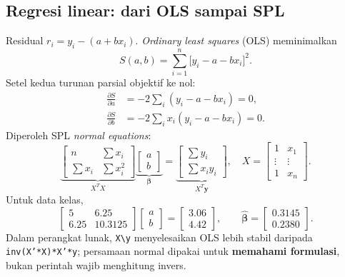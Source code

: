 \subsection{Regresi linear: dari OLS sampai SPL}
Residual $r_i=y_i-(a+bx_i)$. \emph{Ordinary least squares} (OLS) meminimalkan
\begin{equation}
S(a,b)=\sum_{i=1}^n\bigl[y_i-a-bx_i\bigr]^2.
\end{equation}
Setel kedua turunan parsial objektif ke nol:
\begin{align}
\frac{\partial S}{\partial a}&=-2\sum_i(y_i-a-bx_i)=0,\\
\frac{\partial S}{\partial b}&=-2\sum_ix_i(y_i-a-bx_i)=0.
\end{align}
Diperoleh SPL \emph{normal equations}:
\begin{equation}
\underbrace{\begin{bmatrix}n&\sum x_i\\\sum x_i&\sum x_i^2\end{bmatrix}}_{X^TX}
\underbrace{\begin{bmatrix}a\\b\end{bmatrix}}_{\boldsymbol\beta}
=\underbrace{\begin{bmatrix}\sum y_i\\\sum x_i y_i\end{bmatrix}}_{X^T\mathbf{y}},\quad
X=\begin{bmatrix}1&x_1\\\vdots&\vdots\\1&x_n\end{bmatrix}.
\label{eq:linear_normal}
\end{equation}
Untuk data kelas,
\begin{equation}
\begin{bmatrix}5&6.25\\6.25&10.3125\end{bmatrix}
\begin{bmatrix}a\\b\end{bmatrix}
=\begin{bmatrix}3.06\\4.42\end{bmatrix},\qquad
\widehat{\boldsymbol\beta}=\begin{bmatrix}0.3145\\0.2380\end{bmatrix}.
\end{equation}
Dalam perangkat lunak, \texttt{X\textbackslash y} menyelesaikan OLS lebih stabil daripada \texttt{inv(X'*X)*X'*y}; persamaan normal dipakai untuk \textbf{memahami formulasi}, bukan perintah wajib menghitung invers.


